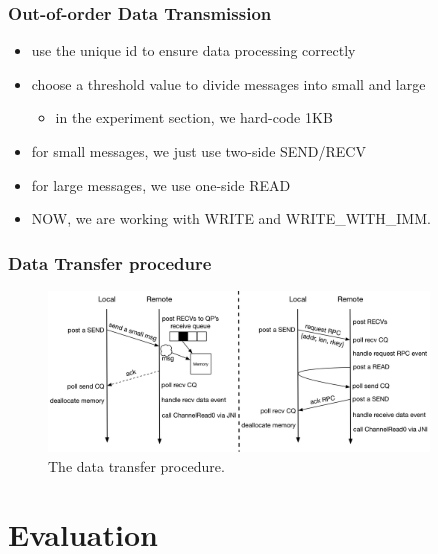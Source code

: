 \documentclass{beamer}
\begin{document}
\begin{frame}
  \frametitle{Out-of-order Data Transmission}
  \begin{itemize}
  \item use the unique id to ensure data processing correctly
  \item choose a threshold value to divide messages into small and large
    \begin{itemize}
    \item in the experiment section, we hard-code 1KB
    \end{itemize}
  \item for small messages, we just use two-side SEND/RECV
  \item for large messages, we use one-side READ
  \item NOW, we are working with WRITE and WRITE\_WITH\_IMM.
  \end{itemize}
\end{frame}

\begin{frame}
  \frametitle{Data Transfer procedure}
  \begin{figure}[!b]
    \centering
    \includegraphics[width=0.9\textwidth]{data-procedure.png}
    \caption{The data transfer procedure.}
    \label{fig:data-procedure}
  \end{figure}
\end{frame}


\section{Evaluation}
\end{document}
